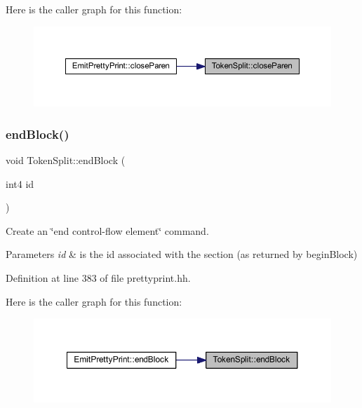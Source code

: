 Here is the caller graph for this function\+:
\nopagebreak
\begin{figure}[H]
\begin{center}
\leavevmode
\includegraphics[width=350pt]{class_token_split_a713ced640b138dbe6931c2eb5dd7ddbe_icgraph}
\end{center}
\end{figure}
\mbox{\label{class_token_split_ab68c64d47f6d2456c645af28d9200425}} 
\subsubsection{\texorpdfstring{endBlock()}{endBlock()}}
{\footnotesize\ttfamily void Token\+Split\+::end\+Block (\begin{DoxyParamCaption}\item[{int4}]{id }\end{DoxyParamCaption})\hspace{0.3cm}{\ttfamily [inline]}}



Create an \char`\"{}end control-\/flow element\char`\"{} command. 


\begin{DoxyParams}{Parameters}
{\em id} & is the id associated with the section (as returned by begin\+Block) \\
\hline
\end{DoxyParams}


Definition at line 383 of file prettyprint.\+hh.

Here is the caller graph for this function\+:
\nopagebreak
\begin{figure}[H]
\begin{center}
\leavevmode
\includegraphics[width=350pt]{class_token_split_ab68c64d47f6d2456c645af28d9200425_icgraph}
\end{center}
\end{figure}
\mbox{\label{class_token_split_acf7d7054bbd3afe3c8d609484fec0e9e}} 
